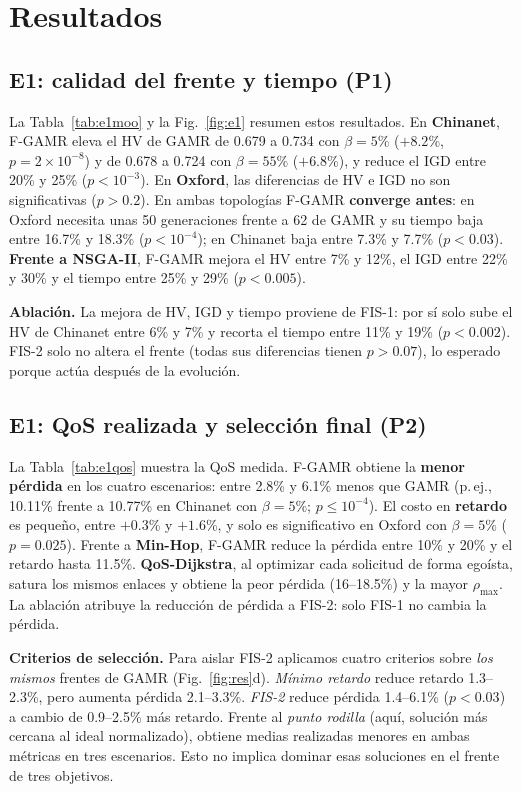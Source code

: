 \documentclass[conference]{IEEEtran}
\begin{document}


\section{Resultados}
\subsection{E1: calidad del frente y tiempo (P1)}
La Tabla~\ref{tab:e1moo} y la Fig.~\ref{fig:e1} resumen estos resultados. En \textbf{Chinanet}, F-GAMR eleva el HV de GAMR de 0.679 a 0.734 con $\beta=5\%$ ($+8.2\%$, $p=2\times10^{-8}$) y de 0.678 a 0.724 con $\beta=55\%$ ($+6.8\%$), y reduce el IGD entre 20\% y 25\% ($p<10^{-3}$). En \textbf{Oxford}, las diferencias de HV e IGD no son significativas ($p>0.2$). En ambas topologías F-GAMR \textbf{converge antes}: en Oxford necesita unas 50 generaciones frente a 62 de GAMR y su tiempo baja entre 16.7\% y 18.3\% ($p<10^{-4}$); en Chinanet baja entre 7.3\% y 7.7\% ($p<0.03$). \textbf{Frente a NSGA-II}, F-GAMR mejora el HV entre 7\% y 12\%, el IGD entre 22\% y 30\% y el tiempo entre 25\% y 29\% ($p<0.005$).

\textbf{Ablación.} La mejora de HV, IGD y tiempo proviene de FIS-1: por sí solo sube el HV de Chinanet entre 6\% y 7\% y recorta el tiempo entre 11\% y 19\% ($p<0.002$). FIS-2 solo no altera el frente (todas sus diferencias tienen $p>0.07$), lo esperado porque actúa después de la evolución.

\subsection{E1: QoS realizada y selección final (P2)}
La Tabla~\ref{tab:e1qos} muestra la QoS medida. F-GAMR obtiene la \textbf{menor pérdida} en los cuatro escenarios: entre 2.8\% y 6.1\% menos que GAMR (p.\,ej., 10.11\% frente a 10.77\% en Chinanet con $\beta=5\%$; $p\le10^{-4}$). El costo en \textbf{retardo} es pequeño, entre $+0.3$\% y $+1.6$\%, y solo es significativo en Oxford con $\beta=5\%$ ($p=0.025$). Frente a \textbf{Min-Hop}, F-GAMR reduce la pérdida entre 10\% y 20\% y el retardo hasta 11.5\%. \textbf{QoS-Dijkstra}, al optimizar cada solicitud de forma egoísta, satura los mismos enlaces y obtiene la peor pérdida (16--18.5\%) y la mayor $\rho_{\max}$. La ablación atribuye la reducción de pérdida a FIS-2: solo FIS-1 no cambia la pérdida.

\textbf{Criterios de selección.} Para aislar FIS-2 aplicamos cuatro criterios sobre \emph{los mismos} frentes de GAMR (Fig.~\ref{fig:res}d). \emph{Mínimo retardo} reduce retardo 1.3--2.3\%, pero aumenta pérdida 2.1--3.3\%. \emph{FIS-2} reduce pérdida 1.4--6.1\% ($p<0.03$) a cambio de 0.9--2.5\% más retardo. Frente al \emph{punto rodilla} (aquí, solución más cercana al ideal normalizado), obtiene medias realizadas menores en ambas métricas en tres escenarios. Esto no implica dominar esas soluciones en el frente de tres objetivos.
\end{document}
